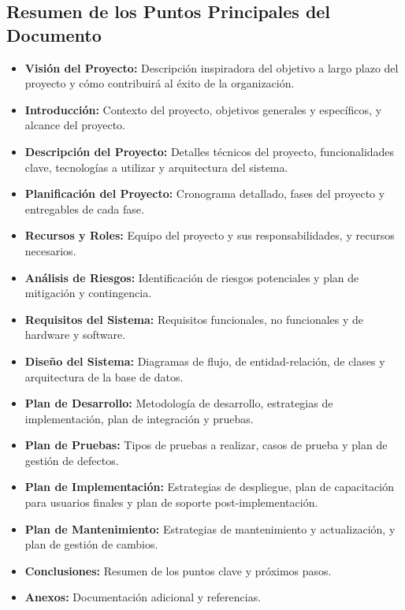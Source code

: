\subsection{Resumen de los Puntos Principales del Documento}

\begin{itemize}
    \item \textbf{Visión del Proyecto:} Descripción inspiradora del objetivo a largo plazo del proyecto y cómo contribuirá al éxito de la organización.
    \item \textbf{Introducción:} Contexto del proyecto, objetivos generales y específicos, y alcance del proyecto.
    \item \textbf{Descripción del Proyecto:} Detalles técnicos del proyecto, funcionalidades clave, tecnologías a utilizar y arquitectura del sistema.
    \item \textbf{Planificación del Proyecto:} Cronograma detallado, fases del proyecto y entregables de cada fase.
    \item \textbf{Recursos y Roles:} Equipo del proyecto y sus responsabilidades, y recursos necesarios.
    \item \textbf{Análisis de Riesgos:} Identificación de riesgos potenciales y plan de mitigación y contingencia.
    \item \textbf{Requisitos del Sistema:} Requisitos funcionales, no funcionales y de hardware y software.
    \item \textbf{Diseño del Sistema:} Diagramas de flujo, de entidad-relación, de clases y arquitectura de la base de datos.
    \item \textbf{Plan de Desarrollo:} Metodología de desarrollo, estrategias de implementación, plan de integración y pruebas.
    \item \textbf{Plan de Pruebas:} Tipos de pruebas a realizar, casos de prueba y plan de gestión de defectos.
    \item \textbf{Plan de Implementación:} Estrategias de despliegue, plan de capacitación para usuarios finales y plan de soporte post-implementación.
    \item \textbf{Plan de Mantenimiento:} Estrategias de mantenimiento y actualización, y plan de gestión de cambios.
    \item \textbf{Conclusiones:} Resumen de los puntos clave y próximos pasos.
    \item \textbf{Anexos:} Documentación adicional y referencias.
\end{itemize}
